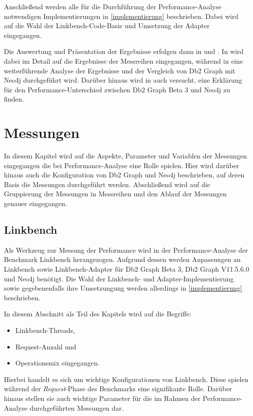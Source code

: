 Anschließend werden alle für die Durchführung der Performance-Analyse notwendigen Implementierungen in \autoref{implementierung} beschrieben. Dabei wird auf die Wahl der Linkbench-Code-Basis und Umsetzung der Adapter eingegangen. 

Die Auswertung und Präsentation der Ergebnisse erfolgen dann in  und . In  wird dabei im Detail auf die Ergebnisse der Messreihen eingegangen, während in  eine weiterführende Analyse der Ergebnisse und der Vergleich von Db2 Graph mit Neo4j durchgeführt wird. Darüber hinaus wird in  auch versucht, eine Erklärung für den Performance-Unterschied zwischen Db2 Graph Beta 3 und Neo4j zu finden. 

\chapter{Messungen}
\label{messungen}
In diesem Kapitel wird auf die Aspekte, Parameter und Variablen der Messungen eingegangen die bei Performance-Analyse eine Rolle spielen. Hier wird darüber hinaus auch die Konfiguration von Db2 Graph und Neo4j beschrieben, auf deren Basis die Messungen durchgeführt werden. Abschließend wird auf die Gruppierung der Messungen in Messreihen und den Ablauf der Messungen genauer eingegangen.  

\section{Linkbench}
Als Werkzeug zur Messung der Performance wird in der Performance-Analyse der Benchmark Linkbench herangezogen. Aufgrund dessen werden Anpassungen an Linkbench  sowie Linkbench-Adapter für Db2 Graph Beta 3, Db2 Graph V11.5.6.0 und Neo4j benötigt. Die Wahl der Linkbench- und Adapter-Implementierung sowie gegebenenfalls ihre Umsetzungung werden allerdings in \autoref{implementierung} beschrieben. 

In diesem Abschnitt als Teil des Kapitels  wird auf die Begriffe: 
\begin{itemize}
    \item Linkbench-Threads,
    \item Request-Anzahl und
    \item Operationsmix eingegangen.
\end{itemize}
Hierbei handelt es sich um wichtige Konfigurationen von Linkbench. Diese spielen während der \textit{Request}-Phase des Benchmarks eine signifikante Rolle. Darüber hinaus stellen sie auch wichtige Parameter für die im Rahmen der Performance-Analyse durchgeführten Messungen dar. 

